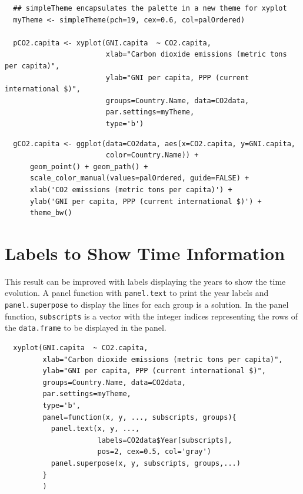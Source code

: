 \documentclass[smallroyalvopaper]{memoir}
\begin{document}

\lstset{language=r,label= ,caption= ,captionpos=b,numbers=none}
\begin{lstlisting}
  ## simpleTheme encapsulates the palette in a new theme for xyplot
  myTheme <- simpleTheme(pch=19, cex=0.6, col=palOrdered)
  
  pCO2.capita <- xyplot(GNI.capita  ~ CO2.capita,
                        xlab="Carbon dioxide emissions (metric tons per capita)",
                        ylab="GNI per capita, PPP (current international $)",
                        groups=Country.Name, data=CO2data,
                        par.settings=myTheme,
                        type='b')
\end{lstlisting}

\lstset{language=r,label= ,caption= ,captionpos=b,numbers=none}
\begin{lstlisting}
  gCO2.capita <- ggplot(data=CO2data, aes(x=CO2.capita, y=GNI.capita,
                        color=Country.Name)) +
      geom_point() + geom_path() +
      scale_color_manual(values=palOrdered, guide=FALSE) +
      xlab('CO2 emissions (metric tons per capita)') +
      ylab('GNI per capita, PPP (current international $)') +
      theme_bw()
\end{lstlisting}

\section{Labels to Show Time Information}
\label{sec:orgb4bf40e}
This result can be improved with labels displaying the years to show
the time evolution.  A panel function with \texttt{panel.text} to print the
year labels and \texttt{panel.superpose} to display the lines for each group
is a solution. In the panel function, \texttt{subscripts} is a vector with
the integer indices representing the rows of the \texttt{data.frame} to be
displayed in the panel.

 

\lstset{language=r,label= ,caption= ,captionpos=b,numbers=none}
\begin{lstlisting}
  xyplot(GNI.capita  ~ CO2.capita,
         xlab="Carbon dioxide emissions (metric tons per capita)",
         ylab="GNI per capita, PPP (current international $)",
         groups=Country.Name, data=CO2data,
         par.settings=myTheme,
         type='b', 
         panel=function(x, y, ..., subscripts, groups){
           panel.text(x, y, ...,
                      labels=CO2data$Year[subscripts],
                      pos=2, cex=0.5, col='gray')
           panel.superpose(x, y, subscripts, groups,...)
         }
         )
\end{lstlisting}
\end{document}
